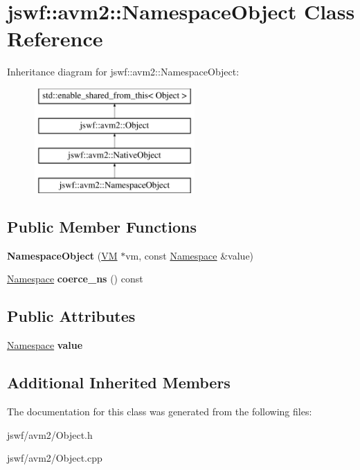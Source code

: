 \hypertarget{classjswf_1_1avm2_1_1_namespace_object}{\section{jswf\+:\+:avm2\+:\+:Namespace\+Object Class Reference}
\label{classjswf_1_1avm2_1_1_namespace_object}
}
Inheritance diagram for jswf\+:\+:avm2\+:\+:Namespace\+Object\+:\begin{figure}[H]
\begin{center}
\leavevmode
\includegraphics[height=4.000000cm]{classjswf_1_1avm2_1_1_namespace_object}
\end{center}
\end{figure}
\subsection*{Public Member Functions}
\begin{DoxyCompactItemize}
\item 
\hypertarget{classjswf_1_1avm2_1_1_namespace_object_a9b2ccd529b652b62df9b463780538072}{{\bfseries Namespace\+Object} (\hyperlink{classjswf_1_1avm2_1_1_v_m}{V\+M} $\ast$vm, const \hyperlink{structjswf_1_1avm2_1_1_namespace}{Namespace} \&value)}\label{classjswf_1_1avm2_1_1_namespace_object_a9b2ccd529b652b62df9b463780538072}

\item 
\hypertarget{classjswf_1_1avm2_1_1_namespace_object_a7e068d204be0abe49aac072622e2da20}{\hyperlink{structjswf_1_1avm2_1_1_namespace}{Namespace} {\bfseries coerce\+\_\+ns} () const }\label{classjswf_1_1avm2_1_1_namespace_object_a7e068d204be0abe49aac072622e2da20}

\end{DoxyCompactItemize}
\subsection*{Public Attributes}
\begin{DoxyCompactItemize}
\item 
\hypertarget{classjswf_1_1avm2_1_1_namespace_object_a3a71b9b39f57b88e0bd0f082a7936c66}{\hyperlink{structjswf_1_1avm2_1_1_namespace}{Namespace} {\bfseries value}}\label{classjswf_1_1avm2_1_1_namespace_object_a3a71b9b39f57b88e0bd0f082a7936c66}

\end{DoxyCompactItemize}
\subsection*{Additional Inherited Members}


The documentation for this class was generated from the following files\+:\begin{DoxyCompactItemize}
\item 
jswf/avm2/Object.\+h\item 
jswf/avm2/Object.\+cpp\end{DoxyCompactItemize}
